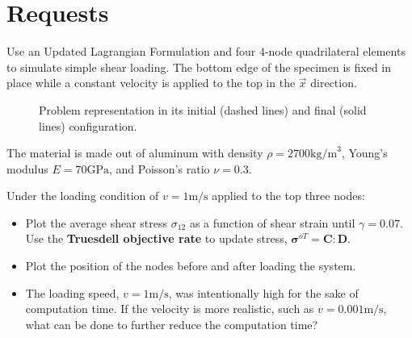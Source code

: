 \section{Requests}
\label{sec:requests}

Use an Updated Lagrangian Formulation and four 4-node quadrilateral elements to simulate simple shear loading.
The bottom edge of the specimen is fixed in place while a constant velocity is applied to the top in the $\vec{x}$ direction.

\begin{figure}[h]
    \centering
    \caption{Problem representation in its initial (dashed lines) and final (solid lines) configuration.}
    \label{fig:problem_representation}
\end{figure}

The material is made out of aluminum with density $\rho = 2700 \text{kg/m}^3$, Young's modulus $E = 70 \text{GPa}$, and Poisson's ratio $\nu = 0.3$.

Under the loading condition of $v = 1 \text{m/s}$ applied to the top three nodes:

\begin{itemize}
    \item Plot the average shear stress $\sigma_{12}$ as a function of shear strain until $\gamma = 0.07$.
          Use the \textbf{Truesdell objective rate} to update stress, $\boldsymbol{\sigma}^{oT} = \boldsymbol{C} : \boldsymbol{D}$.
    \item Plot the position of the nodes before and after loading the system.
    \item The loading speed, $v = 1 \text{m/s}$, was intentionally high for the sake of computation time.
          If the velocity is more realistic, such as $v = 0.001 \text{m/s}$, what can be done to further reduce the computation time?
\end{itemize}

